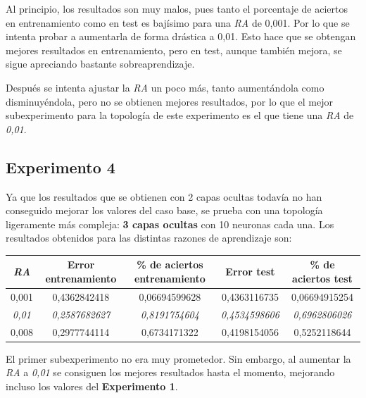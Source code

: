 \documentclass{uc3mpracticas}
\begin{document}
Al principio, los resultados son muy malos, pues tanto el porcentaje de aciertos en entrenamiento como en test es bajísimo para una \textit{RA} de 0,001. Por lo que se intenta probar a aumentarla de forma drástica a 0,01. Esto hace que se obtengan mejores resultados en entrenamiento, pero en test, aunque también mejora, se sigue apreciando bastante sobreaprendizaje.

\vspace{2mm}

Después se intenta ajustar la \textit{RA} un poco más, tanto aumentándola como disminuyéndola, pero no se obtienen mejores resultados, por lo que el mejor subexperimento para la topología de este experimento es el que tiene una \textit{RA} de \textit{0,01}.


\subsection{Experimento 4}

Ya que los resultados que se obtienen con 2 capas ocultas todavía no han conseguido mejorar los valores del caso base, se prueba con una topología ligeramente más compleja: \textbf{3 capas ocultas} con 10 neuronas cada una. Los resultados obtenidos para las distintas razones de aprendizaje son:

\begin{center}
  \begin{tabular}{|c|c|c|c|c|}
    \hline
        \textit{\textbf{RA}}  & \textbf{Error entrenamiento} & \textbf{\% de aciertos entrenamiento} & \textbf{Error test} & \textbf{\% de aciertos test}\\ \hline
        0,001                 &  0,4362842418                &  0,06694599628                        &  0,4363116735       &  0,06694915254              \\ \hline
        \textit{0,01}         &  \textit{0,2587682627}       &  \textit{0,8191754604}                &  \textit{0,4534598606}&  \textit{0,6962806026}    \\ \hline
        0,008                 &  0,2977744114                &  0,6734171322                         &  0,4198154056       &  0,5252118644               \\ \hline

  \end{tabular}
\end{center}

El primer subexperimento no era muy prometedor. Sin embargo, al aumentar la \textit{RA} a \textit{0,01} se consiguen los mejores resultados hasta el momento, mejorando incluso los valores del \textbf{Experimento 1}.
\end{document}
